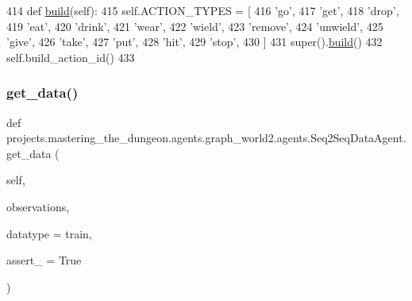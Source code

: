 \begin{DoxyCode}
414     \textcolor{keyword}{def }\hyperlink{namespaceparlai_1_1mturk_1_1tasks_1_1talkthewalk_1_1download_a8c0fbb9b6dfe127cb8c1bd6e7c4e33fd}{build}(self):
415         self.ACTION\_TYPES = [
416             \textcolor{stringliteral}{'go'},
417             \textcolor{stringliteral}{'get'},
418             \textcolor{stringliteral}{'drop'},
419             \textcolor{stringliteral}{'eat'},
420             \textcolor{stringliteral}{'drink'},
421             \textcolor{stringliteral}{'wear'},
422             \textcolor{stringliteral}{'wield'},
423             \textcolor{stringliteral}{'remove'},
424             \textcolor{stringliteral}{'unwield'},
425             \textcolor{stringliteral}{'give'},
426             \textcolor{stringliteral}{'take'},
427             \textcolor{stringliteral}{'put'},
428             \textcolor{stringliteral}{'hit'},
429             \textcolor{stringliteral}{'stop'},
430         ]
431         super().\hyperlink{namespaceparlai_1_1mturk_1_1tasks_1_1talkthewalk_1_1download_a8c0fbb9b6dfe127cb8c1bd6e7c4e33fd}{build}()
432         self.build\_action\_id()
433 
\end{DoxyCode}
\mbox{\label{classprojects_1_1mastering__the__dungeon_1_1agents_1_1graph__world2_1_1agents_1_1Seq2SeqDataAgent_aa7bf3db7ca3b36cb8b67b2341a3ce676}} 
\subsubsection{\texorpdfstring{get\+\_\+data()}{get\_data()}}
{\footnotesize\ttfamily def projects.\+mastering\+\_\+the\+\_\+dungeon.\+agents.\+graph\+\_\+world2.\+agents.\+Seq2\+Seq\+Data\+Agent.\+get\+\_\+data (\begin{DoxyParamCaption}\item[{}]{self,  }\item[{}]{observations,  }\item[{}]{datatype = {\ttfamily \textquotesingle{}train\textquotesingle{}},  }\item[{}]{assert\+\_\+ = {\ttfamily True} }\end{DoxyParamCaption})}



